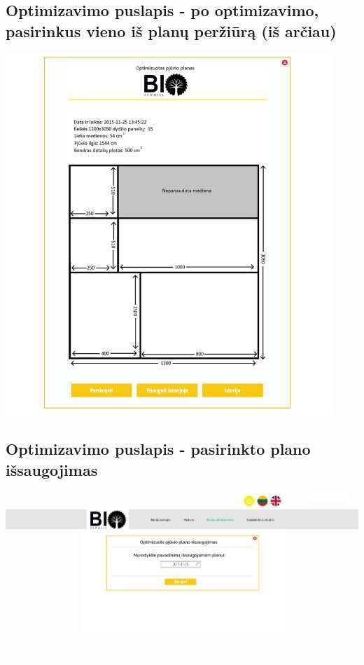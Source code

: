 \documentclass[a4paper,12pt]{article}
\begin{document}
\subsection{Optimizavimo puslapis - po optimizavimo, pasirinkus vieno iš planų peržiūrą (iš arčiau)}
\hspace{-2cm}
\includegraphics[scale=1.2]{interfeisai/optimizavimoPuslapisPrisijungusPasirinktoPerziura2}

\subsection{Optimizavimo puslapis - pasirinkto plano išsaugojimas}
\hspace{-2cm}
\includegraphics[scale=0.5]{interfeisai/optimizavimoPuslapisPrisijungusPasirinktoPlanoIsaugojimas}
\end{document}

